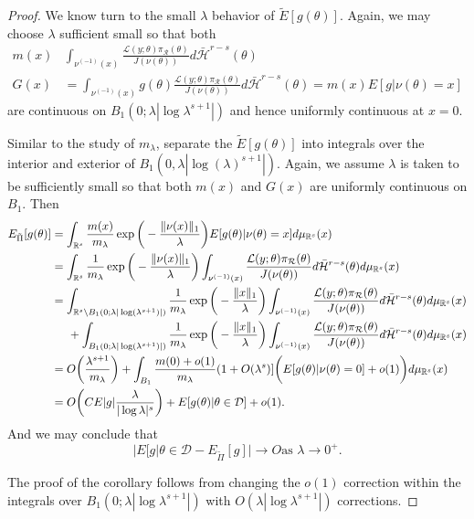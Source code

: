\documentclass[10pt,fleqn]{article} \pdfoutput=1
\DeclareMathOperator{\1}{\mathbbm{1}} \DeclareMathOperator{\bigO}{\mc O}
\begin{document}
\begin{proof}
	We know turn to the small $\lambda$ behavior of $\tilde{E}[g(\theta)].$
	Again, we may choose $\lambda$ sufficient small so that both \begin{align*}
		m(x) & \int_{\nu^{(-1)}(x)}
		\frac{\mathcal{L}(y;\theta)\pi_\mathcal{R}(\theta)}{J(\nu(\theta))}
		d\bar{\mathcal{H}}^{r-s}(\theta) \\ G(x)&= \int_{\nu^{(-1)}(x)}
		g(\theta)
		\frac{\mathcal{L}(y;\theta)\pi_\mathcal{R}(\theta)}{J(\nu(\theta))}
		d\bar{\mathcal{H}}^{r-s}(\theta) =m(x)E[g|\nu(\theta)=x]\end{align*} are
	continuous on $B_1(0;\lambda|\log \lambda^{s+1}|)$ and hence uniformly
	continuous at $x=0.$

	Similar to the study of $m_\lambda$, separate the $\tilde{E}[g(\theta)]$
	into integrals over the interior and exterior of
	$B_1(0,\lambda|\log(\lambda)^{s+1}|)$. Again, we assume $\lambda$ is taken
	to be sufficiently small so that both $m(x)$ and $G(x)$ are uniformly
	continuous on $B_1$. Then \begin{align*} E_{\tilde{\Pi}}[g(\theta)] & =
		\int_{\mathbb{R}^s}
		\frac{m(x)}{m_\lambda}\exp\bigg(-\frac{\|\nu(x)\|_1}{\lambda}\bigg)E[g(\theta)|\nu(\theta)=x]d\mu_{\mathbb{R}^s}(x)
		\\ &= \int_{\mathbb{R}^s}
		\frac{1}{m_\lambda}\exp\bigg(-\frac{\|\nu(x)\|_1}{\lambda}\bigg)\int_{\nu^{(-1)}(x)}
		\frac{\mathcal{L}(y;\theta)\pi_\mathcal{R}(\theta)}{J(\nu(\theta))}d\bar{\mathcal{H}}^{r-s}(\theta)
		d\mu_{\mathbb{R}^s}(x)               \\ &=\int_{\mathbb{R}^s \setminus
			B_1(0;\lambda|\log(\lambda^{s+1})|)}
		\frac{1}{m_\lambda}\exp\bigg(-\frac{\|x\|_1}{\lambda}\bigg)
		\int_{\nu^{(-1)}(x)}
		\frac{\mathcal{L}(y;\theta)\pi_\mathcal{R}(\theta)}{J(\nu(\theta))}d\bar{\mathcal{H}}^{r-s}(\theta)
		d\mu_{\mathbb{R}^s}(x)               \\ &\hspace{0.5 cm} +
		\int_{B_1(0;\lambda|\log(\lambda^{s+1})|)}
		\frac{1}{m_\lambda}\exp\bigg(-\frac{\|x\|_1}{\lambda}\bigg)
		\int_{\nu^{(-1)}(x)}
		\frac{\mathcal{L}(y;\theta)\pi_\mathcal{R}(\theta)}{J(\nu(\theta))}d\bar{\mathcal{H}}^{r-s}(\theta)
		d\mu_{\mathbb{R}^s}(x)               \\ &= O\bigg(
		\frac{\lambda^{s+1}}{m_\lambda} \bigg) + \int_{B_1}
		\frac{m(0)+o(1)}{m_\lambda}(1+O(\lambda^s)]\bigg(E[g(\theta)|\nu(\theta)=0]
		+ o(1) \bigg) d\mu_{\mathbb{R}^s}(x) \\ &= O\bigg( C
		E|g|\frac{\lambda}{|\log\lambda|^s}\bigg) + E[g(\theta)|\theta \in
				\mathcal{D}] + o(1).\end{align*} And we may conclude that
	$$\bigg|E[g|\theta\in\mathcal{D} - E_{\tilde{\Pi}}[g] \bigg| \to O \text{
			as } \lambda\to0^+.$$

	The proof of the corollary follows from changing the $o(1)$ correction
	within the integrals over $B_1(0;\lambda|\log \lambda^{s+1}|)$ with
	$O(\lambda |\log \lambda^{s+1}|)$ corrections.  \end{proof}


  
\end{document}
